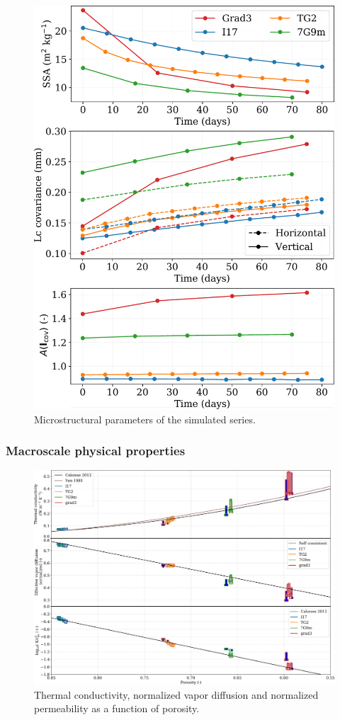 \documentclass[draft,ms]{agujournal2019}
\begin{document}
\begin{figure}
    \centering
    \includegraphics[width=0.6\linewidth]{Figures/4_images_microstructure.pdf}
    \caption{Microstructural parameters of the simulated series.}
    \label{fig:4_images_microstruct}
\end{figure}


\subsubsection{Macroscale physical properties}

\begin{figure}
    \centering
    \includegraphics[width=\linewidth]{Figures/T_plot_new_long_colle.pdf}
    \caption{Thermal conductivity, normalized vapor diffusion and normalized permeability as a function of porosity.}
    \label{fig:Tplot}
\end{figure}
\end{document}
